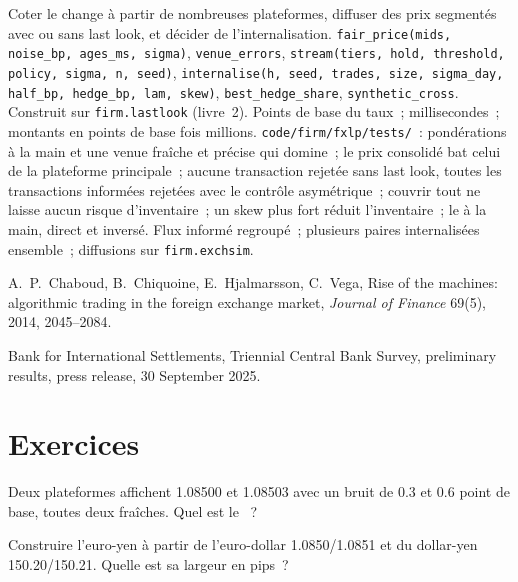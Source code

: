 \begin{build}
 Coter le change à partir de nombreuses plateformes, diffuser des prix segmentés avec ou sans last look, et décider de l'internalisation.
 \texttt{fair\_price(mids, noise\_bp, ages\_ms, sigma)}, \texttt{venue\_errors},
\texttt{stream(tiers, hold, threshold, policy, sigma, n, seed)}, \texttt{internalise(h, seed, trades, size, sigma\_day, half\_bp, hedge\_bp, lam, skew)}, \texttt{best\_hedge\_share},
\texttt{synthetic\_cross}. Construit sur \texttt{firm.lastlook} (livre~2).
 Points de base du taux~; millisecondes~; montants en points de base fois millions.
 \texttt{code/firm/fxlp/tests/}~: pondérations à la main et une venue fraîche et précise qui domine~; le prix consolidé bat celui de la
plateforme principale~; aucune transaction rejetée sans last look, toutes les transactions informées rejetées avec le contrôle asymétrique~; couvrir tout ne laisse aucun risque d'inventaire~; un skew plus fort
réduit l'inventaire~; le  à la main, direct et inversé.
 Flux informé regroupé~; plusieurs paires internalisées ensemble~; diffusions sur \texttt{firm.exchsim}.
\end{build}

\begin{omsources}
\item A.~P.~Chaboud, B.~Chiquoine, E.~Hjalmarsson, C.~Vega, Rise of the machines: algorithmic trading in the foreign exchange market, \emph{Journal
of Finance} 69(5), 2014, 2045--2084.
\item Bank for International Settlements, Triennial Central Bank Survey, preliminary results, press release, 30 September 2025.
\end{omsources}

\section{Exercices}

\begin{exercise}[$\star$]\label{exo:hf:fx-market-making:1}
Deux plateformes affichent 1.08500 et 1.08503 avec un bruit de 0.3 et 0.6 point de base, toutes deux fraîches. Quel est le ~?
\end{exercise}

\begin{exercise}[$\star$]\label{exo:hf:fx-market-making:2}
Construire l'euro-yen à partir de l'euro-dollar 1.0850/1.0851 et du dollar-yen 150.20/150.21. Quelle est sa largeur en pips~?
\end{exercise}

